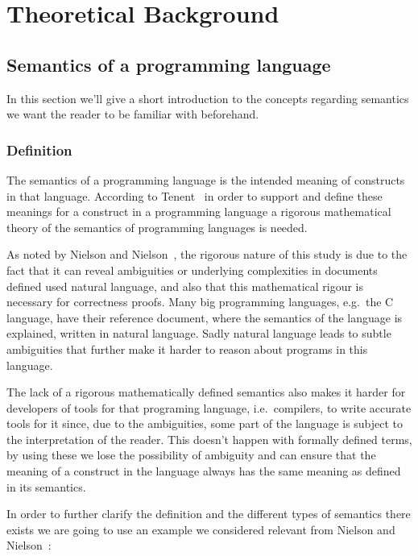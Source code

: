 \section{Theoretical Background}

\subsection{Semantics of a programming language}

In this section we'll give a short introduction to the concepts regarding semantics we want the reader to be familiar with beforehand.

\subsubsection{Definition}

The semantics of a programming language is the intended meaning of constructs in that language.
According to Tenent~\parencite{tennent} in order to support and define these meanings for a construct in a programming language a rigorous mathematical theory of the semantics of programming languages is needed.

As noted by Nielson and Nielson~\parencite{nielson}, the rigorous nature of this study is due to the fact that it can reveal ambiguities or underlying complexities in documents defined used natural language, and also that this mathematical rigour is necessary for correctness proofs.
Many big programming languages, e.g.\ the C language, have their reference document, where the semantics of the language is explained, written in natural language.
Sadly natural language leads to subtle ambiguities that further make it harder to reason about programs in this language.

The lack of a rigorous mathematically defined semantics also makes it harder for developers of tools for that programing language, i.e.\ compilers, to write accurate tools for it since, due to the ambiguities, some part of the language is subject to the interpretation of the reader.
This doesn't happen with formally defined terms, by using these we lose the possibility of ambiguity and can ensure that the meaning of a construct in the language always has the same meaning as defined in its semantics.

In order to further clarify the definition and the different types of semantics there exists we are going to use an example we considered relevant from Nielson and Nielson~\parencite{nielson}:

